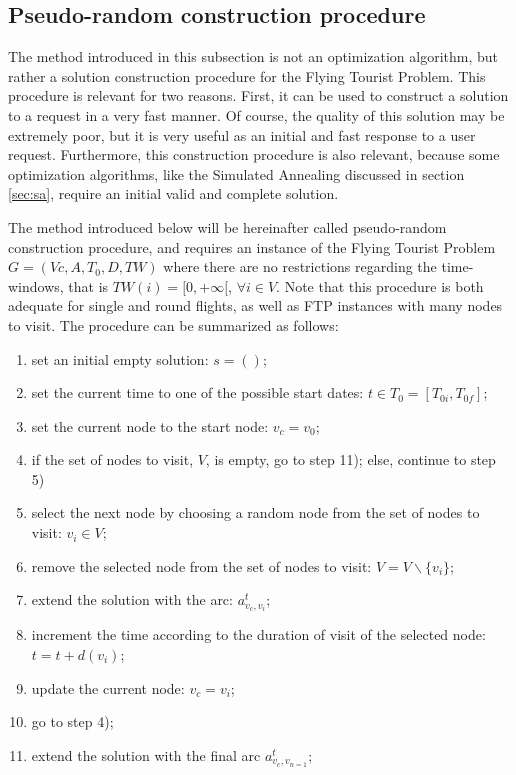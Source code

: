 \subsection{Pseudo-random construction procedure}
\label{sec:pseudo_random}

The method introduced in this subsection is not an optimization algorithm, but rather a solution construction procedure for the Flying Tourist Problem. This procedure is relevant for two reasons. First, it can be used to construct a solution to a request in a very fast manner. Of course, the quality of this solution may be extremely poor, but it is very useful as an initial and fast response to a user request. 
Furthermore, this construction procedure is also relevant, because some optimization algorithms, like the Simulated Annealing discussed in section \ref{sec:sa}, require an initial valid and complete solution.

The method introduced below will be hereinafter called pseudo-random construction procedure, and requires an instance of the Flying Tourist Problem $G=(Vc,A,T_0,D,TW)$ where there are no restrictions regarding the time-windows, that is $TW(i) = [0, +\infty[$, $\forall i \in V$. Note that this procedure is both adequate for single and round flights, as well as FTP instances with many nodes to visit. The procedure can be summarized as follows:

\begin{enumerate}
    \item set an initial empty solution: $s=()$;
    \item set the current time to one of the possible start dates: $t \in T_0=[T_{0i}, T_{0f}]$;
    \item set the current node to the start node: $v_c = v_0$;
    \item if the set of nodes to visit, $V$, is empty, go to step 11); else, continue to step 5)
    \item select the next node by choosing a random node from the set of nodes to visit: $v_i \in V$;
    \item remove the selected node from the set of nodes to visit: $V=V\backslash\{v_i\}$;
    \item extend the solution with the arc: $a_{v_c, v_i}^t$;
    \item increment the time according to the duration of visit of the selected node: $t=t+d(v_i)$;
    \item update the current node: $v_c=v_i$;
    \item go to step 4);
    \item extend the solution with the final arc $a_{v_c, v_{n=1}}^t$;
\end{enumerate}